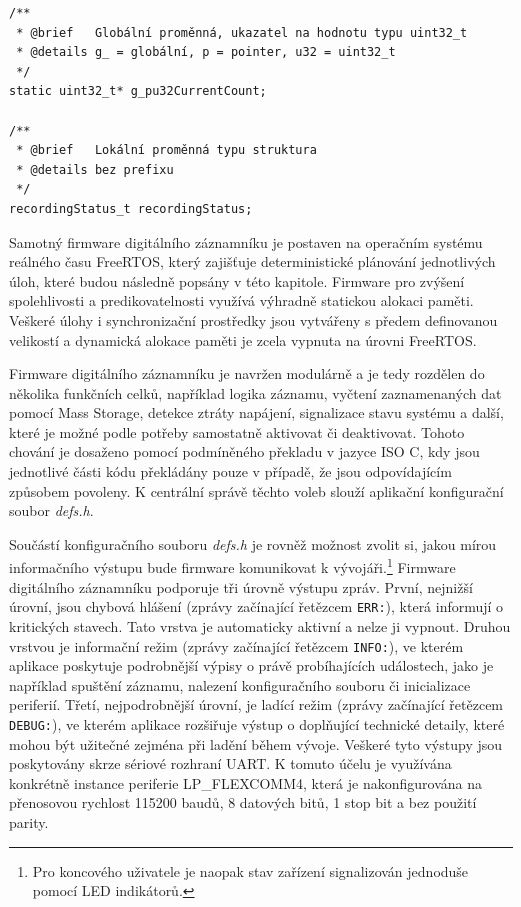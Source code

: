 \begin{verbatim}
/**
 * @brief 	Globální proměnná, ukazatel na hodnotu typu uint32_t
 * @details g_ = globální, p = pointer, u32 = uint32_t
 */
static uint32_t* g_pu32CurrentCount;

/**
 * @brief 	Lokální proměnná typu struktura
 * @details bez prefixu
 */
recordingStatus_t recordingStatus;
\end{verbatim}

\newpage

Samotný firmware digitálního záznamníku je postaven na operačním systému reálného času FreeRTOS, který zajišťuje deterministické plánování jednotlivých úloh, které budou následně popsány v této kapitole. Firmware pro zvýšení spolehlivosti a predikovatelnosti využívá výhradně statickou alokaci paměti. Veškeré úlohy i synchronizační prostředky jsou vytvářeny s předem definovanou velikostí a dynamická alokace paměti je zcela vypnuta na úrovni FreeRTOS.


Firmware digitálního záznamníku je navržen modulárně a je tedy rozdělen do několika funkčních celků, například logika záznamu, vyčtení zaznamenaných dat pomocí Mass Storage, detekce ztráty napájení, signalizace stavu systému a další, které je možné podle potřeby samostatně aktivovat či deaktivovat. Tohoto chování je dosaženo pomocí podmíněného překladu v jazyce ISO C, kdy jsou jednotlivé části kódu překládány pouze v případě, že jsou odpovídajícím způsobem povoleny. K centrální správě těchto voleb slouží aplikační konfigurační soubor \textit{defs.h}. 

Součástí konfiguračního souboru \textit{defs.h} je rovněž možnost zvolit si, jakou mírou informačního výstupu bude firmware komunikovat k vývojáři.\footnote{Pro koncového uživatele je naopak stav zařízení signalizován jednoduše pomocí LED indikátorů.} Firmware digitálního záznamníku podporuje tři úrovně výstupu zpráv. První, nejnižší úrovní, jsou chybová hlášení (zprávy začínající řetězcem \texttt{ERR:}), která informují o kritických stavech. Tato vrstva je automaticky aktivní a nelze ji vypnout. Druhou vrstvou je informační režim (zprávy začínající řetězcem \texttt{INFO:}), ve kterém aplikace poskytuje podrobnější výpisy o právě probíhajících událostech, jako je například spuštění záznamu, nalezení konfiguračního souboru či inicializace periferií. Třetí, nejpodrobnější úrovní, je ladící režim (zprávy začínající řetězcem \texttt{DEBUG:}), ve kterém aplikace rozšiřuje výstup o doplňující technické detaily, které mohou být užitečné zejména při ladění během vývoje. Veškeré tyto výstupy jsou poskytovány skrze sériové rozhraní UART. K tomuto účelu je využívána konkrétně instance periferie LP\_FLEXCOMM4, která je nakonfigurována na přenosovou rychlost 115200 baudů, 8 datových bitů, 1 stop bit a bez použití parity.

